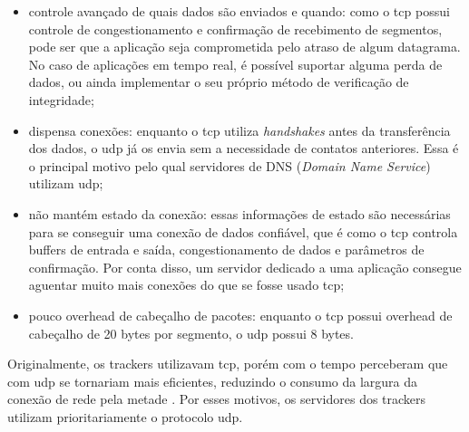 \begin{itemize}
    \item controle avançado de quais dados são enviados e quando: como o \gls*{tcp}
        possui controle de congestionamento e confirmação de recebimento de segmentos,
        pode ser que a aplicação seja comprometida pelo atraso de algum datagrama. No
        caso de aplicações em tempo real, é possível suportar alguma perda de dados, ou
        ainda implementar o seu próprio método de verificação de integridade;

    \item dispensa conexões: enquanto o \gls*{tcp} utiliza \emph{handshakes} antes da
        transferência dos dados, o \gls*{udp} já os envia sem a necessidade de
        contatos anteriores. Essa é o principal motivo pelo qual servidores de DNS
        (\emph{Domain Name Service}) utilizam \gls*{udp};

    \item não mantém estado da conexão: essas informações de estado são necessárias para
        se conseguir uma conexão de dados confiável, que é como o \gls*{tcp} controla
        buffers de entrada e saída, congestionamento de dados e parâmetros de
        confirmação. Por conta disso, um servidor dedicado a uma aplicação consegue
        aguentar muito mais conexões do que se fosse usado \gls*{tcp};

    \item pouco \gls{overhead} de cabeçalho de pacotes: enquanto o \gls*{tcp} possui
        \gls*{overhead} de cabeçalho de 20 bytes por segmento, o \gls*{udp} possui 8
        bytes.
\end{itemize}

Originalmente, os \glspl*{tracker} utilizavam \gls*{tcp}, porém com o tempo perceberam
que com \gls*{udp} se tornariam mais eficientes, reduzindo o consumo da largura da
conexão de rede pela metade \cite{site:tracker-udp}. Por esses motivos, os servidores
dos \glspl{tracker} utilizam prioritariamente o protocolo \gls*{udp}.
